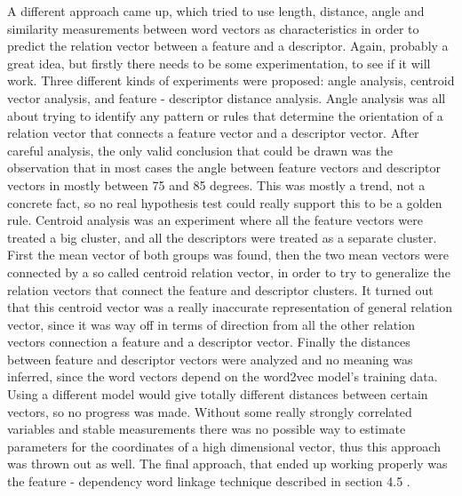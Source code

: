 \documentclass{sig-alternate}
\begin{document}
A different approach came up, which tried to use length, distance, angle and similarity measurements between word vectors as characteristics in order to predict the relation vector between a feature and a descriptor. Again, probably a great idea, but firstly there needs to be some experimentation, to see if it will work. Three different kinds of experiments were proposed: angle analysis, centroid vector analysis, and feature - descriptor distance analysis. Angle analysis was all about trying to identify any pattern or rules that determine the orientation of a relation vector that connects a feature vector and a descriptor vector. After careful analysis, the only valid conclusion that could be drawn was the observation that in most cases the angle between feature vectors and descriptor vectors in mostly between 75 and 85 degrees. This was mostly a trend, not a concrete fact, so no real hypothesis test could really support this to be a golden rule. Centroid analysis was an experiment where all the feature vectors were treated a big cluster, and all the descriptors were treated as a separate cluster. First the mean vector of both groups was found, then the two mean vectors were connected by a so called centroid relation vector, in order to try to generalize the relation vectors that connect the feature and descriptor clusters. It turned out that this centroid vector was a really inaccurate representation of general relation vector, since it was way off in terms of direction from all the other relation vectors connection a feature and a descriptor vector. Finally the distances between feature and descriptor vectors were analyzed and no meaning was inferred, since the word vectors depend on the word2vec model's training data. Using a different model would give totally different distances between certain vectors, so no progress was made. Without some really strongly correlated variables and stable measurements there was no possible way to estimate parameters for the coordinates of a high dimensional vector, thus this approach was thrown out as well. The final approach, that ended up working properly was the feature - dependency word linkage technique described in section 4.5 .
\end{document}
